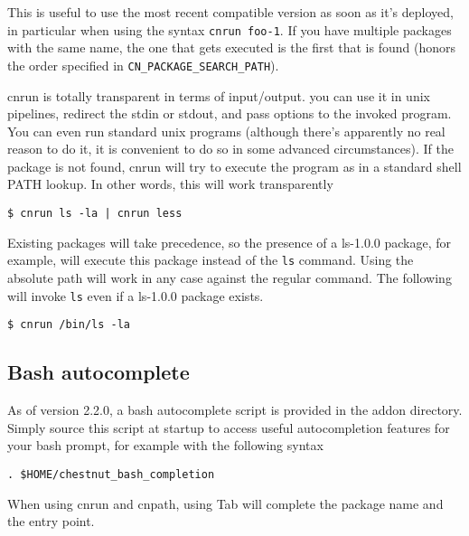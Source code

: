 This is useful to use the most recent compatible version as soon as it's
deployed, in particular when using the syntax \verb+cnrun foo-1+.  If you have
multiple packages with the same name, the one that gets executed is the first
that is found (honors the order specified in \verb+CN_PACKAGE_SEARCH_PATH+). 

cnrun is totally transparent in terms of input/output. you can use it in
unix pipelines, redirect the stdin or stdout, and pass options to the
invoked program. You can even run standard unix programs (although there's
apparently no real reason to do it, it is convenient to do so in some
advanced circumstances). If the package is not found, cnrun will try to
execute the program as in a standard shell PATH lookup. In other words, this
will work transparently
\begin{verbatim}
$ cnrun ls -la | cnrun less
\end{verbatim}

Existing packages will take precedence, so the presence of a ls-1.0.0 package,
for example, will execute this package instead of the \verb+ls+ command. Using
the absolute path will work in any case against the regular command. The
following will invoke \verb+ls+ even if a ls-1.0.0 package exists.
\begin{verbatim}
$ cnrun /bin/ls -la 
\end{verbatim}

\subsection{Bash autocomplete}

As of version 2.2.0, a bash autocomplete script is provided in the addon
directory. Simply source this script at startup to access useful autocompletion
features for your bash prompt, for example with the following syntax
\begin{verbatim}
. $HOME/chestnut_bash_completion 
\end{verbatim}
When using cnrun and cnpath, using Tab will complete the package name and the
entry point.
